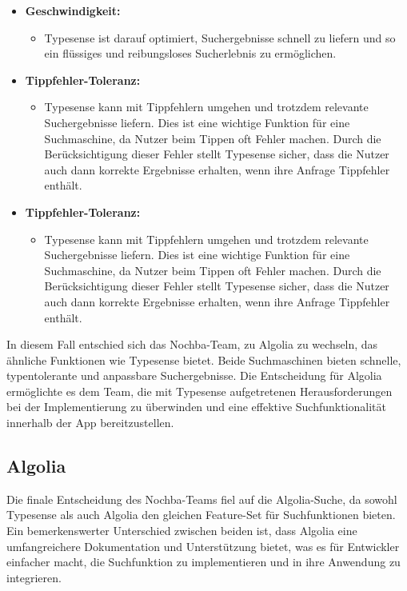 \begin{itemize}
  \item \textbf{Geschwindigkeit:}
        \begin{itemize}
          \item {Typesense ist darauf optimiert, Suchergebnisse schnell zu liefern und so ein flüssiges und reibungsloses Sucherlebnis zu ermöglichen.}
        \end{itemize}
  \item \textbf{Tippfehler-Toleranz:}
        \begin{itemize}
          \item {Typesense kann mit Tippfehlern umgehen und trotzdem relevante Suchergebnisse liefern. Dies ist eine wichtige Funktion für eine Suchmaschine, da Nutzer beim Tippen oft Fehler machen. Durch die Berücksichtigung dieser Fehler stellt Typesense sicher, dass die Nutzer auch dann korrekte Ergebnisse erhalten, wenn ihre Anfrage Tippfehler enthält.}
        \end{itemize}
  \item \textbf{Tippfehler-Toleranz:}
        \begin{itemize}
          \item {Typesense kann mit Tippfehlern umgehen und trotzdem relevante Suchergebnisse liefern. Dies ist eine wichtige Funktion für eine Suchmaschine, da Nutzer beim Tippen oft Fehler machen. Durch die Berücksichtigung dieser Fehler stellt Typesense sicher, dass die Nutzer auch dann korrekte Ergebnisse erhalten, wenn ihre Anfrage Tippfehler enthält.}
        \end{itemize}
\end{itemize}

In diesem Fall entschied sich das Nochba-Team, zu Algolia zu wechseln, das ähnliche Funktionen wie Typesense bietet. Beide Suchmaschinen bieten schnelle, typentolerante und anpassbare Suchergebnisse. Die Entscheidung für Algolia ermöglichte es dem Team, die mit Typesense aufgetretenen Herausforderungen bei der Implementierung zu überwinden und eine effektive Suchfunktionalität innerhalb der App bereitzustellen.

\subsection{Algolia}

Die finale Entscheidung des Nochba-Teams fiel auf die Algolia-Suche, da sowohl Typesense als auch Algolia den gleichen Feature-Set für Suchfunktionen bieten. Ein bemerkenswerter Unterschied zwischen beiden ist, dass Algolia eine umfangreichere Dokumentation und Unterstützung bietet, was es für Entwickler einfacher macht, die Suchfunktion zu implementieren und in ihre Anwendung zu integrieren.


